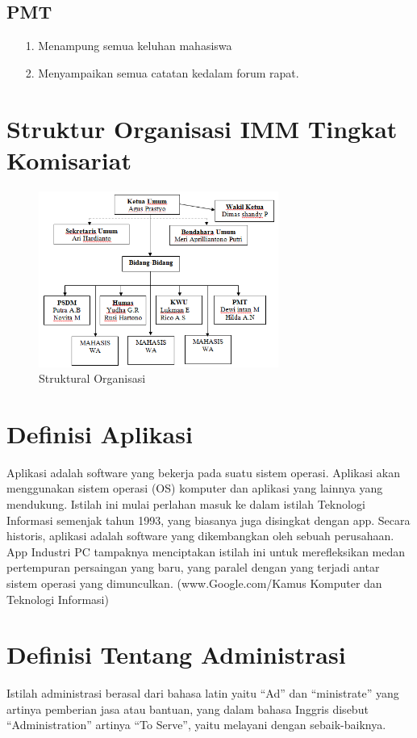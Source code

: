 \documentclass{jtetiproposalskripsi}
\begin{document}
\subsection{PMT}
\begin{itemize}
\item[1.] Menampung semua keluhan mahasiswa
\item[2.] Menyampaikan semua catatan kedalam forum rapat.
\end{itemize}

\section{Struktur Organisasi IMM Tingkat Komisariat}
\begin{figure}[h]
\centering 
 \includegraphics[width=0.7\textwidth]{gambar/1}  
 \caption{Struktural Organisasi}
\end{figure}
\section{Definisi Aplikasi}
Aplikasi adalah software yang bekerja pada suatu sistem operasi. Aplikasi akan menggunakan sistem operasi (OS) komputer dan aplikasi yang lainnya yang mendukung. Istilah ini mulai perlahan masuk ke dalam istilah Teknologi Informasi semenjak tahun 1993, yang biasanya juga disingkat dengan app. Secara historis, aplikasi adalah software yang dikembangkan oleh sebuah perusahaan. App Industri PC tampaknya menciptakan istilah ini untuk merefleksikan medan pertempuran persaingan yang baru, yang paralel dengan yang terjadi antar sistem operasi yang dimunculkan. (www.Google.com/Kamus Komputer dan Teknologi Informasi)
\section{Definisi Tentang Administrasi}
Istilah administrasi berasal dari bahasa latin yaitu “Ad” dan “ministrate” yang artinya pemberian jasa atau bantuan, yang dalam bahasa Inggris disebut “Administration” artinya “To Serve”, yaitu melayani dengan sebaik-baiknya.
\end{document}
